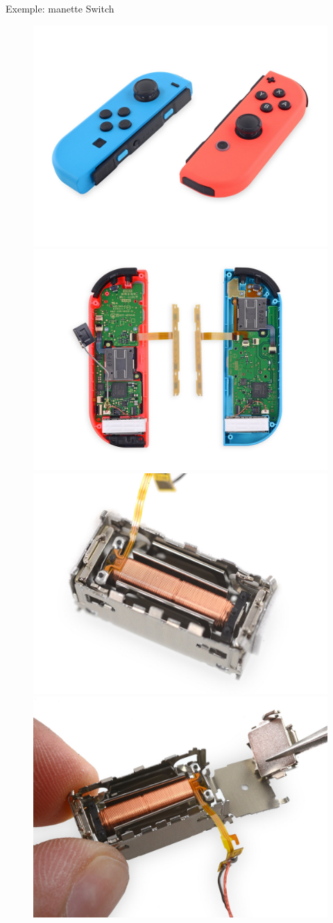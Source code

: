 \documentclass[compress, noflama]{beamer}
\begin{document}
{
\begin{frame}{Exemple: manette Switch}
\begin{figure}
\centering
\includegraphics[width=0.4\linewidth]{images/switch1}
\includegraphics[width=0.4\linewidth]{images/switch2}
\includegraphics[width=0.4\linewidth]{images/HDRumble1}
\includegraphics[width=0.4\linewidth]{images/HDRumble2}
\end{figure}
\end{frame}
}
\end{document}
